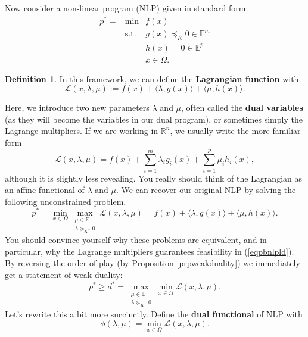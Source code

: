 \documentclass[11pt]{article}
\numberwithin{equation}{section}
\theoremstyle{definition}
\newtheorem{definition}[theorem]{Definition}%
\newcommand{\bE}{\mathbb{E}}
\newcommand{\bR}{\mathbb{R}}
\newcommand{\cL}{\mathcal{L}}
\newcommand{\tst}{\text{s.t.}}
\begin{document}
Now consider a non-linear program (NLP) given in standard form:
\begin{equation}
    \label{eqpbnlpld}
    \begin{array}{ccc}
         p^*=&\min & f(x)  \\
         &\tst & g(x)\preceq_K 0\in\bE^m\\
          &    & h(x)=0\in\bE^p\\
           &   & x\in\Omega.
    \end{array}
\end{equation}
\begin{definition}
In this framework, we can define the \textbf{Lagrangian function} with
\begin{equation}
    \cL(x,\lambda,\mu):=f(x)+\langle \lambda, g(x)\rangle+\langle\mu, h(x)\rangle.
\end{equation}
\end{definition}
Here, we introduce two new parameters $\lambda$ and $\mu$, often called the \textbf{dual variables} (as they will become the variables in our dual program), or sometimes simply the Lagrange multipliers. If we are working in $\bR^n$, we usually write the more familiar form
\begin{equation}
    \cL(x,\lambda,\mu)=f(x)+\sum_{i=1}^m\lambda_ig_i(x)+\sum_{i=1}^p\mu_ih_i(x),
\end{equation}
although it is slightly less revealing. You really should think of the Lagrangian as an affine functional of $\lambda$ and $\mu$. We can recover our original NLP by solving the following unconstrained problem.
\begin{equation}
    p^*=\min_{x\in\Omega}\max_{\substack{\mu\in\bE\\\lambda\succeq_{K^+} 0 }}\cL(x,\lambda,\mu)=f(x)+\langle \lambda, g(x)\rangle+\langle\mu, h(x)\rangle.
\end{equation}
You should convince yourself why these problems are equivalent, and in particular, why the Lagrange multipliers guarantees feasibility in (\ref{eqpbnlpld}). By reversing the order of play (by Proposition \ref{prpweakduality}) we immediately get a statement of weak duality:
\begin{equation}
    \label{prelimweakduality}
    p^*\ge d^*=\max_{\substack{\mu\in\bE\\\lambda\succeq_{K^+} 0 }}\min_{x\in\Omega}\cL(x,\lambda,\mu).
\end{equation}
Let's rewrite this a bit more succinctly. Define the \textbf{dual functional} of NLP with
\begin{equation}
    \phi(\lambda,\mu)=\min_{x\in\Omega}\cL(x,\lambda,\mu).
\end{equation}
\end{document}
